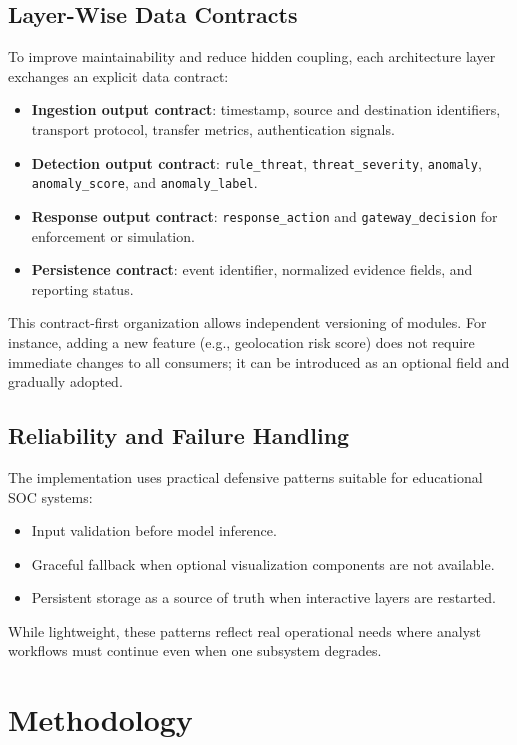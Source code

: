 \documentclass[conference]{IEEEtran}
\begin{document}
\subsection{Layer-Wise Data Contracts}
To improve maintainability and reduce hidden coupling, each architecture layer exchanges an explicit data contract:
\begin{itemize}
    \item \textbf{Ingestion output contract}: timestamp, source and destination identifiers, transport protocol, transfer metrics, authentication signals.
    \item \textbf{Detection output contract}: \texttt{rule\_threat}, \texttt{threat\_severity}, \texttt{anomaly}, \texttt{anomaly\_score}, and \texttt{anomaly\_label}.
    \item \textbf{Response output contract}: \texttt{response\_action} and \texttt{gateway\_decision} for enforcement or simulation.
    \item \textbf{Persistence contract}: event identifier, normalized evidence fields, and reporting status.
\end{itemize}

This contract-first organization allows independent versioning of modules. For instance, adding a new feature (e.g., geolocation risk score) does not require immediate changes to all consumers; it can be introduced as an optional field and gradually adopted.

\subsection{Reliability and Failure Handling}
The implementation uses practical defensive patterns suitable for educational SOC systems:
\begin{itemize}
    \item Input validation before model inference.
    \item Graceful fallback when optional visualization components are not available.
    \item Persistent storage as a source of truth when interactive layers are restarted.
\end{itemize}

While lightweight, these patterns reflect real operational needs where analyst workflows must continue even when one subsystem degrades.

\section{Methodology}
\end{document}

